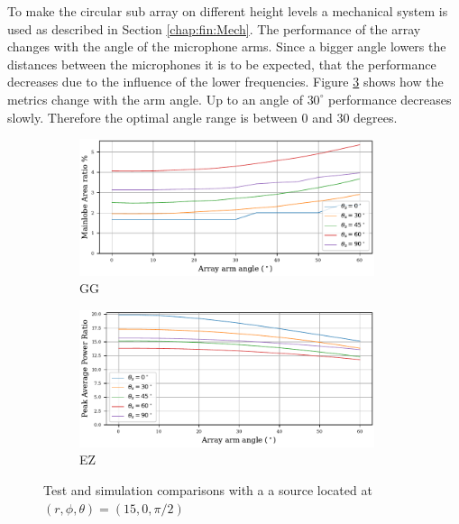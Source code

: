 To make the circular sub array on different height levels
a mechanical system is used as described in Section \ref{chap:fin:Mech}.
The performance of the array changes with the angle of the microphone arms.
Since a bigger angle lowers the distances between the microphones it is to be 
expected, that the performance decreases due to the influence of the lower frequencies.
Figure \ref*{fig:fintilt} shows how the metrics change with the arm angle.
Up to an angle of $30^\circ$ performance decreases slowly.
Therefore the optimal angle range is between 0 and 30 degrees.

\begin{figure}[h!]
	\centering
	\begin{subfigure}[b]{1\textwidth}
		\centering
		\includegraphics[width=0.95\textwidth]{images/5_array_evaluation/tilt_area.pdf}
		\caption{GG}
		\label{fig:finartilt}
	\end{subfigure}
	\begin{subfigure}[b]{1\textwidth}
		\centering
		\includegraphics[width=0.95\textwidth]{images/5_array_evaluation/tilt_PAP.pdf}
		\caption{EZ}
		\label{fig:finpaptilt}
	\end{subfigure}
	\caption{Test and simulation comparisons with a a source located at $(r, \phi, \theta) = (15, 0, \pi/2)$}
	\label{fig:fintilt}
\end{figure}


